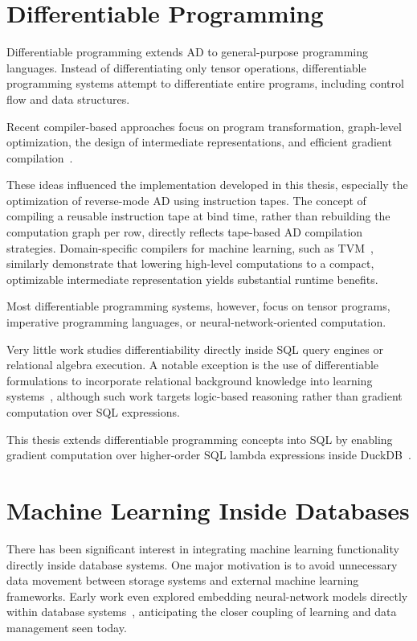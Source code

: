 \documentclass[12pt]{report}
\begin{document}
\section{Differentiable Programming}

Differentiable programming extends AD to general-purpose programming languages. Instead of differentiating only tensor operations, differentiable programming systems attempt to differentiate entire programs, including control flow and data structures.

Recent compiler-based approaches focus on program transformation, graph-level
optimization, the design of intermediate representations, and efficient gradient
compilation~\cite{innes2018adjoint,baudart2021stan}.

These ideas influenced the implementation developed in this thesis, especially the optimization of reverse-mode AD using instruction tapes. The concept of compiling a reusable instruction tape at bind time, rather than rebuilding the computation graph per row, directly reflects tape-based AD compilation strategies. Domain-specific compilers for machine learning, such as TVM~\cite{chen2018tvm}, similarly demonstrate that lowering high-level computations to a compact, optimizable intermediate representation yields substantial runtime benefits.

Most differentiable programming systems, however, focus on tensor programs,
imperative programming languages, or neural-network-oriented computation.

Very little work studies differentiability directly inside SQL query engines or relational algebra execution. A notable exception is the use of differentiable formulations to incorporate relational background knowledge into learning systems~\cite{payani2020relational}, although such work targets logic-based reasoning rather than gradient computation over SQL expressions.

This thesis extends differentiable programming concepts into SQL by enabling gradient computation over higher-order SQL lambda expressions inside DuckDB~\cite{peseux2023differentiable}.

\section{Machine Learning Inside Databases}

There has been significant interest in integrating machine learning functionality directly inside database systems. One major motivation is to avoid unnecessary data movement between storage systems and external machine learning frameworks. Early work even explored embedding neural-network models directly within database systems~\cite{schikuta2008neural}, anticipating the closer coupling of learning and data management seen today.
\end{document}
